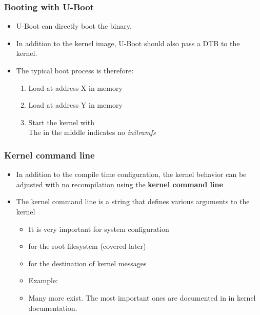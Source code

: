 \begin{frame}
  \frametitle{Booting with U-Boot}
  \begin{itemize}
  \item U-Boot can directly boot the  binary.
  \item In addition to the kernel image, U-Boot should also pass a
        DTB to the kernel.
  \item The typical boot process is therefore:
    \begin{enumerate}
    \item Load  at address X in memory
    \item Load  at address Y in memory
    \item Start the kernel with  \\
      The \code{-} in the middle indicates no {\em initramfs}
    \end{enumerate}
  \end{itemize}
\end{frame}

\begin{frame}
  \frametitle{Kernel command line}
  \begin{itemize}
  \item In addition to the compile time configuration, the kernel
    behavior can be adjusted with no recompilation using the {\bf
      kernel command line}
  \item The kernel command line is a string that defines various
    arguments to the kernel
    \begin{itemize}
    \item It is very important for system configuration
    \item {} for the root filesystem (covered later)
    \item {} for the destination of kernel messages
    \item Example: 
    \item Many more exist. The most important ones are documented
          in  in kernel
          documentation.
    \end{itemize}
  \end{itemize}
\end{frame}

